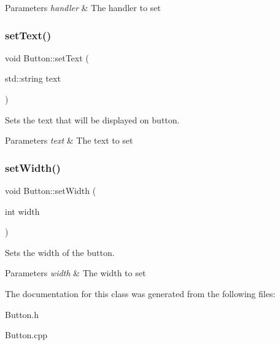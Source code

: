 \begin{DoxyParams}{Parameters}
{\em handler} & The handler to set\\
\hline
\end{DoxyParams}
\mbox{\label{class_button_aad8dccffb2940c1c44d2e515d124143c}} 
\subsubsection{\texorpdfstring{setText()}{setText()}}
{\footnotesize\ttfamily void Button\+::set\+Text (\begin{DoxyParamCaption}\item[{std\+::string}]{text }\end{DoxyParamCaption})}



Sets the text that will be displayed on button. 


\begin{DoxyParams}{Parameters}
{\em text} & The text to set\\
\hline
\end{DoxyParams}
\mbox{\label{class_button_ae1b9fb6d675b102d1b849d5707367e5c}} 
\subsubsection{\texorpdfstring{setWidth()}{setWidth()}}
{\footnotesize\ttfamily void Button\+::set\+Width (\begin{DoxyParamCaption}\item[{int}]{width }\end{DoxyParamCaption})}



Sets the width of the button. 


\begin{DoxyParams}{Parameters}
{\em width} & The width to set\\
\hline
\end{DoxyParams}


The documentation for this class was generated from the following files\+:\begin{DoxyCompactItemize}
\item 
Button.\+h\item 
Button.\+cpp\end{DoxyCompactItemize}
